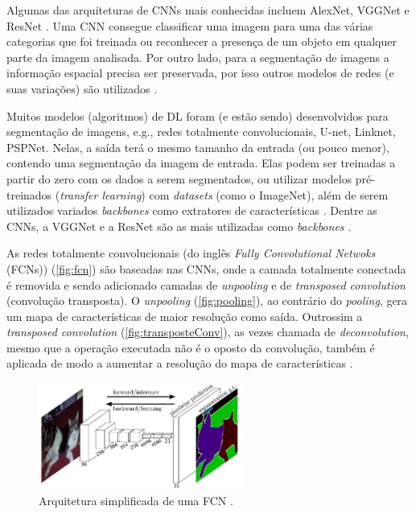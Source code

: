 \documentclass[12pt, a4paper, english, brazil]{article}
\begin{document}
Algumas das arquiteturas de CNNs mais conhecidas incluem AlexNet, VGGNet e ResNet \cite{Minaee_2021}. Uma CNN consegue classificar uma imagem para uma das várias categorias que foi treinada ou reconhecer a presença de um objeto em qualquer parte da imagem analisada. Por outro lado, para a segmentação de imagens a informação espacial precisa ser preservada, por isso outros modelos de redes (e suas variações) são utilizados \cite{Ponti_2017}.

Muitos modelos (algoritmos) de DL foram (e estão sendo) desenvolvidos para segmentação de imagens, e.g., redes totalmente convolucionais, U-net, Linknet, PSPNet. Nelas, a saída terá o mesmo tamanho da entrada (ou pouco menor), contendo uma segmentação da imagem de entrada. Elas podem ser treinadas a partir do zero com os dados a serem segmentados, ou utilizar modelos pré-treinados (\textit{transfer learning}) com \textit{datasets} (como o ImageNet), além de serem utilizados variados \textit{backbones} como extratores de características \cite{Hao_2020, Minaee_2021}. Dentre as CNNs, a VGGNet e a ResNet são as mais utilizadas como \textit{backbones} \cite{Lateef_2019}.

As redes totalmente convolucionais (do inglês \textit{Fully Convolutional Netwoks} (FCNs)) (\autoref{fig:fcn}) são baseadas nas CNNs, onde a camada totalmente conectada é removida e sendo adicionado camadas de \textit{unpooling} e de \textit{transposed convolution} (convolução transposta). O \textit{unpooling} (\autoref{fig:pooling}), ao contrário do \textit{pooling}, gera um mapa de características de maior resolução como saída. Outrossim a \textit{transposed convolution} (\autoref{fig:transposteConv}), as vezes chamada de \textit{deconvolution}, mesmo que a operação executada não é o oposto da convolução, também é aplicada de modo a aumentar a resolução do mapa de características \cite{Long_2015, Fang_2017}. 
\begin{figure}[htbp]
    \centering
    \includegraphics[width=0.6\textwidth]{img/fcn.jpg}
    \caption{Arquitetura simplificada de uma FCN \cite{Long_2015}.}
    \label{fig:fcn}
\end{figure}
\end{document}
